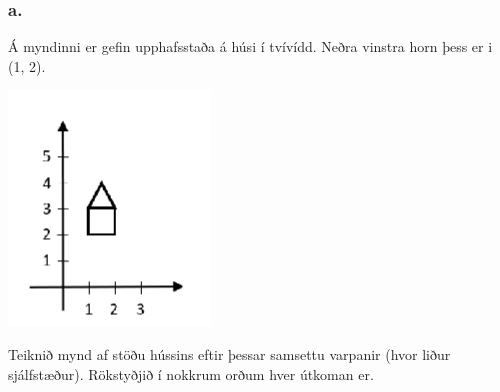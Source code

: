 \documentclass{article}
\begin{document}
\subsubsection{a.} Á myndinni er gefin upphafsstaða á húsi í tvívídd. Neðra vinstra horn þess er i (1, 2).

\includegraphics[scale = 0.9]{myndir/mynd2023a.png}

Teiknið mynd af stöðu hússins eftir þessar samsettu varpanir (hvor liður sjálfstæður). Rökstyðjið í nokkrum orðum hver útkoman er.
\end{document}
